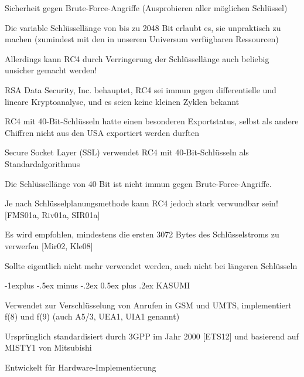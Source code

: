 \documentclass[a4paper]{article}
\makeatletter
\renewcommand{\subsection}{\@startsection{subsection}{2}{0mm}%
 {-1explus -.5ex minus -.2ex}%
 {0.5ex plus .2ex}%
 {\normalfont\normalsize\bfseries}}
\makeatother
\begin{document}
\begin{multicols}{3}
\begin{itemize*}
            \begin{itemize*}
                  \item Sicherheit gegen Brute-Force-Angriffe (Ausprobieren aller möglichen Schlüssel)
                  \begin{itemize*} \item Die variable Schlüssellänge von bis zu 2048 Bit erlaubt es, sie unpraktisch zu machen (zumindest mit den in unserem Universum verfügbaren Ressourcen) \item Allerdings kann RC4 durch Verringerung der Schlüssellänge auch beliebig unsicher gemacht werden! \end{itemize*}
                  \item RSA Data Security, Inc. behauptet, RC4 sei immun gegen differentielle und lineare Kryptoanalyse, und es seien keine kleinen Zyklen bekannt
            \end{itemize*}
            \item
            RC4 mit 40-Bit-Schlüsseln hatte einen besonderen Exportstatus, selbst
            als andere Chiffren nicht aus den USA exportiert werden durften

            \begin{itemize*}
                  \item Secure Socket Layer (SSL) verwendet RC4 mit 40-Bit-Schlüsseln als Standardalgorithmus
                  \item Die Schlüssellänge von 40 Bit ist nicht immun gegen Brute-Force-Angriffe.
            \end{itemize*}
            \item
            Je nach Schlüsselplanungsmethode kann RC4 jedoch stark verwundbar
            sein! {[}FMS01a, Riv01a, SIR01a{]}
            \item
            Es wird empfohlen, mindestens die ersten 3072 Bytes des
            Schlüsselstroms zu verwerfen {[}Mir02, Kle08{]}
            \item
            Sollte eigentlich nicht mehr verwendet werden, auch nicht bei längeren
            Schlüsseln
      \end{itemize*}


      \subsection{KASUMI}

      \begin{itemize*}
            \item
            Verwendet zur Verschlüsselung von Anrufen in GSM und UMTS,
            implementiert f(8) und f(9) (auch A5/3, UEA1, UIA1 genannt)
            \item
            Ursprünglich standardisiert durch 3GPP im Jahr 2000 {[}ETS12{]} und
            basierend auf MISTY1 von Mitsubishi
            \item
            Entwickelt für Hardware-Implementierung


\end{itemize*}
\end{multicols}
\end{document}
